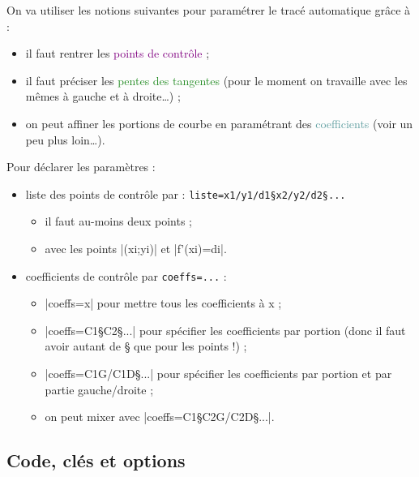\documentclass{article}
\newcommand\ctex[1]{\tcbox[vignettelatex]{#1}}
\begin{document}
\begin{codeinfo}
On va utiliser les notions suivantes pour paramétrer le tracé \og automatique \fg{} grâce à  \ctex{..controls} :
%
\begin{itemize}
	\item il faut rentrer les \textcolor{purple}{\textsf{points de contrôle}} ;
	\item il faut préciser les \textcolor{ForestGreen}{\textsf{pentes des tangentes}} (pour le moment on travaille avec les mêmes à gauche et à droite\ldots) ;
	\item on peut \og affiner \fg{} les portions de courbe en paramétrant des \textcolor{CadetBlue}{\textsf{coefficients}} (voir un peu plus loin\ldots).
\end{itemize}

\medskip

Pour déclarer les paramètres :
%
\begin{itemize}
	\item liste des points de contrôle par : \verb|liste=x1/y1/d1§x2/y2/d2§...|
	\begin{itemize}
		\item il faut au-moins deux points ;
		\item avec les points \pverb|(xi;yi)| et \vverb|f'(xi)=di|.
	\end{itemize}
	\item coefficients de contrôle par \verb|coeffs=...| :
	\begin{itemize}
		\item \averb|coeffs=x| pour mettre tous les coefficients à x ;
		\item \averb|coeffs=C1§C2§...| pour spécifier les coefficients par portion (donc il faut avoir autant de § que pour les points !) ;
		\item \averb|coeffs=C1G/C1D§...| pour spécifier les coefficients par portion et par partie gauche/droite ;
		\item on peut mixer avec \averb|coeffs=C1§C2G/C2D§...|.
	\end{itemize}
\end{itemize}
\end{codeinfo}

\subsection{Code, clés et options}

\begin{codetex}
\end{codetex}
\end{document}
